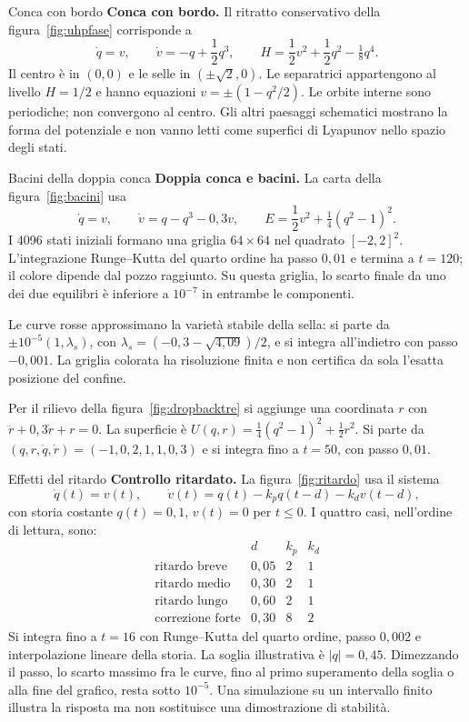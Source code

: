 \documentclass[11pt]{article}
\begin{document}
\begin{formule}{Conca con bordo}
\textbf{Conca con bordo.} Il ritratto conservativo della figura~\ref{fig:uhpfase} corrisponde a
\[
 \dot q=v,\qquad \dot v=-q+\frac{1}{2}q^3,\qquad
 H=\frac{1}{2}v^2+\frac{1}{2}q^2-\tfrac18q^4.
\]
Il centro è in $(0,0)$ e le selle in $(\pm\sqrt2,0)$. Le separatrici appartengono al livello $H=1/2$ e hanno equazioni $v=\pm(1-q^2/2)$. Le orbite interne sono periodiche; non convergono al centro. Gli altri paesaggi schematici mostrano la forma del potenziale e non vanno letti come superfici di Lyapunov nello spazio degli stati.
\end{formule}

\begin{formule}{Bacini della doppia conca}
\textbf{Doppia conca e bacini.} La carta della figura~\ref{fig:bacini} usa
\[
 \dot q=v,\qquad \dot v=q-q^3-0{,}3v,\qquad
 E=\frac{1}{2}v^2+\tfrac14(q^2-1)^2.
\]
I 4096 stati iniziali formano una griglia $64\times64$ nel quadrato $[-2,2]^2$. L'integrazione Runge--Kutta del quarto ordine ha passo $0{,}01$ e termina a $t=120$; il colore dipende dal pozzo raggiunto. Su questa griglia, lo scarto finale da uno dei due equilibri è inferiore a $10^{-7}$ in entrambe le componenti.

Le curve rosse approssimano la varietà stabile della sella: si parte da $\pm10^{-5}(1,\lambda_s)$, con $\lambda_s=(-0{,}3-\sqrt{4{,}09})/2$, e si integra all'indietro con passo $-0{,}001$. La griglia colorata ha risoluzione finita e non certifica da sola l'esatta posizione del confine.

Per il rilievo della figura~\ref{fig:dropbacktre} si aggiunge una coordinata $r$ con $\ddot r+0{,}3\dot r+r=0$. La superficie è $U(q,r)=\tfrac14(q^2-1)^2+\frac{1}{2}r^2$. Si parte da $(q,r,\dot q,\dot r)=(-1,0{,}2,1{,}1,0{,}3)$ e si integra fino a $t=50$, con passo $0{,}01$.
\end{formule}

\begin{formule}{Effetti del ritardo}
\textbf{Controllo ritardato.} La figura~\ref{fig:ritardo} usa il sistema
\[
 \dot q(t)=v(t),\qquad
 \dot v(t)=q(t)-k_pq(t-d)-k_dv(t-d),
\]
con storia costante $q(t)=0{,}1$, $v(t)=0$ per $t\le0$. I quattro casi, nell'ordine di lettura, sono:
\[
\begin{array}{lccc}
 &d&k_p&k_d\\
 \text{ritardo breve}&0{,}05&2&1\\
 \text{ritardo medio}&0{,}30&2&1\\
 \text{ritardo lungo}&0{,}60&2&1\\
 \text{correzione forte}&0{,}30&8&2
\end{array}
\]
Si integra fino a $t=16$ con Runge--Kutta del quarto ordine, passo $0{,}002$ e interpolazione lineare della storia. La soglia illustrativa è $|q|=0{,}45$. Dimezzando il passo, lo scarto massimo fra le curve, fino al primo superamento della soglia o alla fine del grafico, resta sotto $10^{-5}$. Una simulazione su un intervallo finito illustra la risposta ma non sostituisce una dimostrazione di stabilità.
\end{formule}
\end{document}
